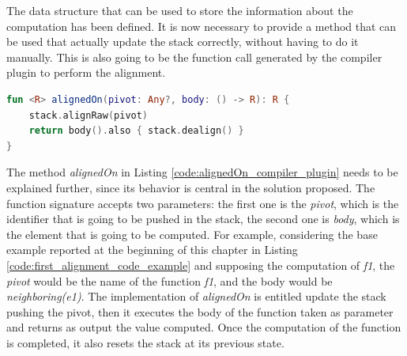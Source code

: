 The data structure that can be used to store the information about the computation has been defined. It is now necessary to provide a method that can be used that actually update the stack correctly, without having to do it manually. This is also going to be the function call generated by the compiler plugin to perform the alignment.
\begin{lstlisting}[caption={Stack interface for KSP}, captionpos=b, language=Kotlin, label={code:alignedOn_compiler_plugin}]
fun <R> alignedOn(pivot: Any?, body: () -> R): R {
    stack.alignRaw(pivot)
    return body().also { stack.dealign() }
}
\end{lstlisting}
The method \textit{alignedOn} in Listing \ref{code:alignedOn_compiler_plugin} needs to be explained further, since its behavior is central in the solution proposed.\newline
The function signature accepts two parameters: the first one is the \textit{pivot}, which is the identifier that is going to be pushed in the stack, the second one is \textit{body}, which is the element that is going to be computed. For example, considering the base example reported at the beginning of this chapter in Listing \ref{code:first_alignment_code_example} and supposing the computation of \textit{f1}, the \textit{pivot} would be the name of the function \textit{f1}, and the body would be \textit{neighboring(e1)}.\newline
The implementation of \textit{alignedOn} is entitled update the stack pushing the pivot, then it executes the body of the function taken as parameter and returns as output the value computed. Once the computation of the function is completed, it also resets the stack at its previous state.

